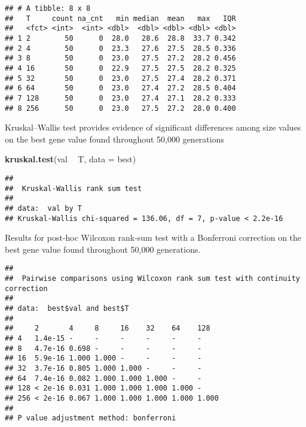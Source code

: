 \documentclass[]{book}
\newenvironment{Shaded}{\begin{snugshade}}{\end{snugshade}}
\newcommand{\DataTypeTok}[1]{\textcolor[rgb]{0.13,0.29,0.53}{#1}}
\newcommand{\KeywordTok}[1]{\textcolor[rgb]{0.13,0.29,0.53}{\textbf{#1}}}
\newcommand{\NormalTok}[1]{#1}
\newcommand{\OperatorTok}[1]{\textcolor[rgb]{0.81,0.36,0.00}{\textbf{#1}}}
\newcommand{\OtherTok}[1]{\textcolor[rgb]{0.56,0.35,0.01}{#1}}
\newcommand{\StringTok}[1]{\textcolor[rgb]{0.31,0.60,0.02}{#1}}
\begin{document}
\begin{verbatim}
## # A tibble: 8 x 8
##   T     count na_cnt   min median  mean   max   IQR
##   <fct> <int>  <int> <dbl>  <dbl> <dbl> <dbl> <dbl>
## 1 2        50      0  28.0   28.6  28.8  33.7 0.342
## 2 4        50      0  23.3   27.6  27.5  28.5 0.336
## 3 8        50      0  23.0   27.5  27.2  28.2 0.456
## 4 16       50      0  22.9   27.5  27.5  28.2 0.325
## 5 32       50      0  23.0   27.5  27.4  28.2 0.371
## 6 64       50      0  23.0   27.4  27.2  28.5 0.404
## 7 128      50      0  23.0   27.4  27.1  28.2 0.333
## 8 256      50      0  23.0   27.5  27.2  28.0 0.400
\end{verbatim}

Kruskal--Wallis test provides evidence of significant differences among size values on the best gene value found throughout 50,000 generations

\begin{Shaded}
\begin{Highlighting}[]
\KeywordTok{kruskal.test}\NormalTok{(val }\OperatorTok{~}\StringTok{ }\NormalTok{T, }\DataTypeTok{data =}\NormalTok{ best)}
\end{Highlighting}
\end{Shaded}

\begin{verbatim}
## 
##  Kruskal-Wallis rank sum test
## 
## data:  val by T
## Kruskal-Wallis chi-squared = 136.06, df = 7, p-value < 2.2e-16
\end{verbatim}

Results for post-hoc Wilcoxon rank-sum test with a Bonferroni correction on the best gene value found throughout 50,000 generations.

\begin{Shaded}
\end{Shaded}

\begin{verbatim}
## 
##  Pairwise comparisons using Wilcoxon rank sum test with continuity correction 
## 
## data:  best$val and best$T 
## 
##     2       4     8     16    32    64    128  
## 4   1.4e-15 -     -     -     -     -     -    
## 8   4.7e-16 0.698 -     -     -     -     -    
## 16  5.9e-16 1.000 1.000 -     -     -     -    
## 32  3.7e-16 0.805 1.000 1.000 -     -     -    
## 64  7.4e-16 0.082 1.000 1.000 1.000 -     -    
## 128 < 2e-16 0.031 1.000 1.000 1.000 1.000 -    
## 256 < 2e-16 0.067 1.000 1.000 1.000 1.000 1.000
## 
## P value adjustment method: bonferroni
\end{verbatim}
\end{document}
